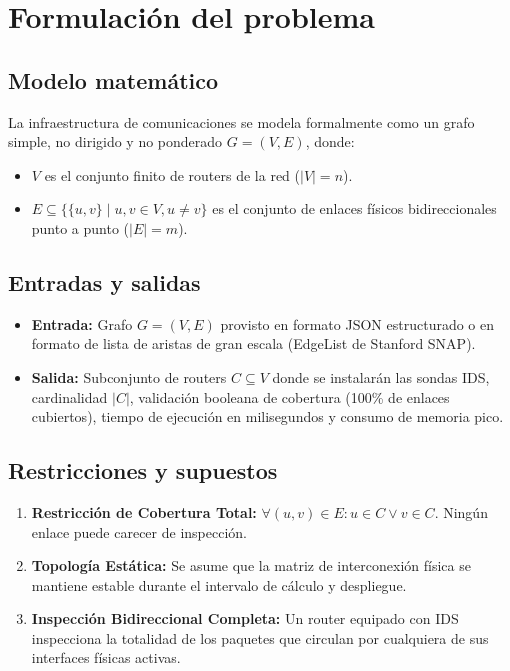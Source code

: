 \documentclass[11pt,a4paper]{article}
\begin{document}
\section{Formulación del problema}
\label{sec:formulacion}

\subsection{Modelo matemático}
La infraestructura de comunicaciones se modela formalmente como un grafo simple, no dirigido y no ponderado $G = (V, E)$, donde:
\begin{itemize}[itemsep=1pt]
	\item $V$ es el conjunto finito de routers de la red ($|V| = n$).
	\item $E \subseteq \{\{u, v\} \mid u, v \in V, u \neq v\}$ es el conjunto de enlaces físicos bidireccionales punto a punto ($|E| = m$).
\end{itemize}

\subsection{Entradas y salidas}
\begin{itemize}[itemsep=1pt]
	\item \textbf{Entrada:} Grafo $G = (V, E)$ provisto en formato JSON estructurado o en formato de lista de aristas de gran escala (EdgeList de Stanford SNAP).
	\item \textbf{Salida:} Subconjunto de routers $C \subseteq V$ donde se instalarán las sondas IDS, cardinalidad $|C|$, validación booleana de cobertura (100\% de enlaces cubiertos), tiempo de ejecución en milisegundos y consumo de memoria pico.
\end{itemize}

\subsection{Restricciones y supuestos}
\begin{enumerate}[itemsep=1pt]
	\item \textbf{Restricción de Cobertura Total:} $\forall (u, v) \in E: u \in C \lor v \in C$. Ningún enlace puede carecer de inspección.
	\item \textbf{Topología Estática:} Se asume que la matriz de interconexión física se mantiene estable durante el intervalo de cálculo y despliegue.
	\item \textbf{Inspección Bidireccional Completa:} Un router equipado con IDS inspecciona la totalidad de los paquetes que circulan por cualquiera de sus interfaces físicas activas.
\end{enumerate}
\end{document}
